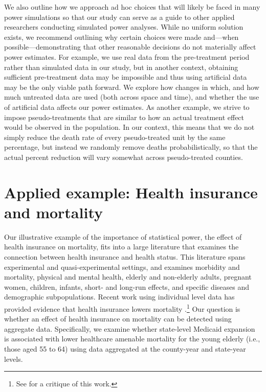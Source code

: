 \documentclass[12pt]{article}%
\begin{document}
We also outline how we approach ad hoc choices that will likely be faced in many power simulations so that our study can serve as a guide to other applied researchers conducting simulated power analyses. 
While no uniform solution exists, we recommend outlining why certain choices were made and---when possible---demonstrating that other reasonable decisions do not materially affect power estimates.  
For example, we use real data from the pre-treatment period rather than simulated data in our study, but in another context, 
obtaining sufficient pre-treatment data may be impossible and thus using artificial data may be the only viable path forward. 
We explore how changes in which, and how much untreated data are used (both across space and time), and whether the use of artificial data affects our power estimates. 
As another example, we strive to impose pseudo-treatments that are similar to how an actual treatment effect would be observed in the population. 
In our context, this means that we do not simply reduce the death rate of every pseudo-treated unit by the same percentage, but instead we randomly remove deaths probabilistically, so that the actual percent reduction will vary somewhat across pseudo-treated counties. 

\section{Applied example: Health insurance and mortality}\label{sec:background_on_hi_and_mort}

Our illustrative example of the importance of statistical power, the effect of health insurance on mortality, fits into a large literature that examines the connection between health insurance and health status. 
This literature spans experimental and quasi-experimental settings, and examines morbidity and mortality, physical and mental health, elderly and non-elderly adults, pregnant women, children, infants, short- and long-run effects, and specific diseases and demographic subpopulations.  
Recent work using individual level data has provided  evidence that health insurance lowers mortality \citep{millerMedicaidMortalityNew2019,goldinHealthInsuranceMortality2021}.\footnote{See \citet{kaestnerMortalityScienceComment2021} for a critique of this work.}  
Our question is whether an effect of health insurance on mortality can be detected using aggregate data. 
Specifically, we examine whether state-level Medicaid expansion is associated with lower healthcare amenable mortality for the young elderly (i.e., those aged 55 to 64) using data aggregated at the county-year and state-year levels. 
\end{document}
